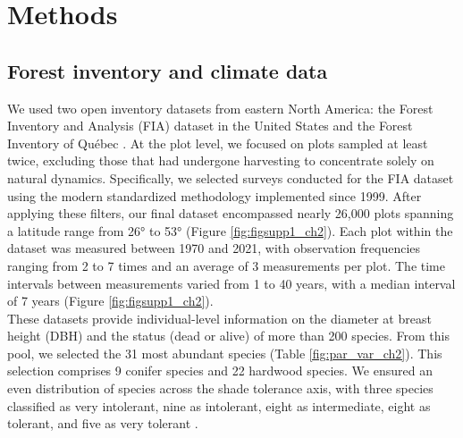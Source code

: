 \hypertarget{methods}{%
\section{Methods}\label{methods}}

\hypertarget{forest-inventory-and-climate-data}{%
\subsection{Forest inventory and climate
data}\label{forest-inventory-and-climate-data}}

We used two open inventory datasets from eastern North America: the
Forest Inventory and Analysis (FIA) dataset in the United States
\citep{OConnell2007} and the Forest Inventory of Québec
\citep{Naturelles2016}. At the plot level, we focused on plots sampled
at least twice, excluding those that had undergone harvesting to
concentrate solely on natural dynamics. Specifically, we selected
surveys conducted for the FIA dataset using the modern standardized
methodology implemented since 1999. After applying these filters, our
final dataset encompassed nearly 26,000 plots spanning a latitude range
from 26° to 53° (Figure \ref{fig:figsupp1_ch2}). Each plot within the dataset was measured
between 1970 and 2021, with observation frequencies ranging from 2 to 7
times and an average of 3 measurements per plot. The time intervals
between measurements varied from 1 to 40 years, with a median interval
of 7 years (Figure \ref{fig:figsupp1_ch2}).\\

These datasets provide individual-level information on the diameter at
breast height (DBH) and the status (dead or alive) of more than 200
species. From this pool, we selected the 31 most abundant species (Table
\ref{fig:par_var_ch2}). This selection comprises 9 conifer species and 22 hardwood species.
We ensured an even distribution of species across the shade tolerance
axis, with three species classified as very intolerant, nine as
intolerant, eight as intermediate, eight as tolerant, and five as very
tolerant \citep{burns1990silvics}.\\

